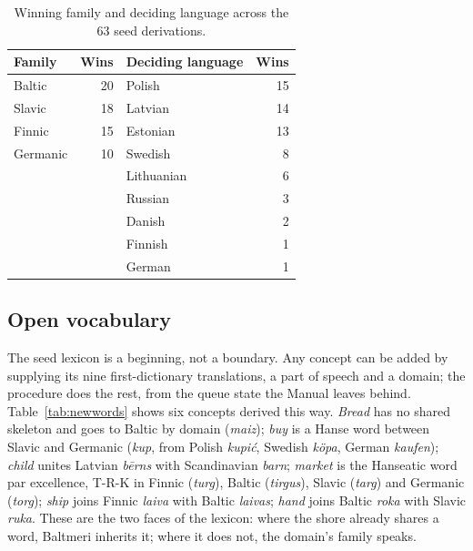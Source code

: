 \begin{table}[t]
\centering\small
\caption{Winning family and deciding language across the 63 seed derivations.}
\label{tab:balance}
\begin{tabular}{@{}lr@{\quad}lr@{}}
\toprule
Family & Wins & Deciding language & Wins \\
\midrule
Baltic & 20 & Polish & 15 \\
Slavic & 18 & Latvian & 14 \\
Finnic & 15 & Estonian & 13 \\
Germanic & 10 & Swedish & 8 \\
 & & Lithuanian & 6 \\
 & & Russian & 3 \\
 & & Danish & 2 \\
 & & Finnish & 1 \\
 & & German & 1 \\
\bottomrule
\end{tabular}
\end{table}

\subsection{Open vocabulary}
The seed lexicon is a beginning, not a boundary. Any concept can be added by supplying its nine first-dictionary translations, a part of speech and a domain; the procedure does the rest, from the queue state the Manual leaves behind. Table~\ref{tab:newwords} shows six concepts derived this way. \emph{Bread} has no shared skeleton and goes to Baltic by domain (\emph{maiz}); \emph{buy} is a Hanse word between Slavic and Germanic (\emph{kup}, from Polish \emph{kupić}, Swedish \emph{köpa}, German \emph{kaufen}); \emph{child} unites Latvian \emph{bērns} with Scandinavian \emph{barn}; \emph{market} is the Hanseatic word par excellence, T-R-K in Finnic (\emph{turg}), Baltic (\emph{tirgus}), Slavic (\emph{targ}) and Germanic (\emph{torg}); \emph{ship} joins Finnic \emph{laiva} with Baltic \emph{laivas}; \emph{hand} joins Baltic \emph{roka} with Slavic \emph{ruka}. These are the two faces of the lexicon: where the shore already shares a word, Baltmeri inherits it; where it does not, the domain's family speaks.


